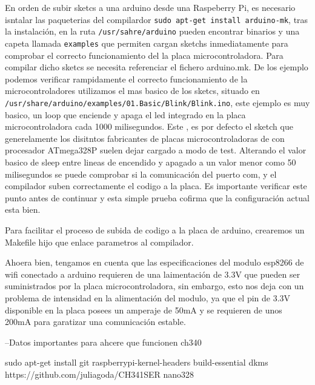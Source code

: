 En orden de subir sketcs a una arduino desde una Raspeberry Pi, es necesario isntalar las paqueterias del compilardor \verb|sudo apt-get install arduino-mk|, tras la instalación, en la ruta \verb|/usr/sahre/arduino| pueden encontrar binarios y una capeta llamada \verb|examples| que permiten cargan sketchs inmediatamente para comprobar el correcto funcionamiento del la placa microcontroladora. Para compilar dicho sketcs se necesita referenciar el fichero arduino.mk. De los ejemplo podemos verificar rampidamente el correcto funcionamiento de la microcontroladores utilizamos el mas basico de los sketcs, situado en \verb|/usr/share/arduino/examples/01.Basic/Blink/Blink.ino|, este ejemplo es muy basico, un loop que enciende y apaga el led integrado en la placa microcontroladora cada 1000 milisegundos. Este , es por defecto el sketch que generelamente los disitntos fabricantes de placas microcontroladoras de con procesador ATmega328P suelen dejar cargado a modo de test. Alterando el valor basico de sleep entre lineas de encendido y apagado a un valor menor como 50 milisegundos se puede comprobar si la comunicación del puerto com, y el compilador suben correctamente el codigo a la placa. Es importante verificar este punto antes de continuar y esta simple prueba cofirma que la configuración actual esta bien.

Para facilitar el proceso de subida de codigo a la placa de arduino, crearemos un Makefile hijo que enlace parametros al compilador.


Ahoera bien, tengamos en cuenta que las especificaciones del modulo esp8266 de wifi conectado a arduino requieren de una laimentación de 3.3V que pueden ser suministrados por la placa microcontroladora, sin embargo, esto nos deja con un problema de intensidad en la alimentación del modulo, ya que el pin de 3.3V disponible en la placa posees un amperaje de 50mA y se requieren de unos 200mA para garatizar una comunicación estable.

--Datos importantes para ahcere que funcionen ch340

sudo apt-get install git raspberrypi-kernel-headers build-essential dkms
https://github.com/juliagoda/CH341SER
nano328
